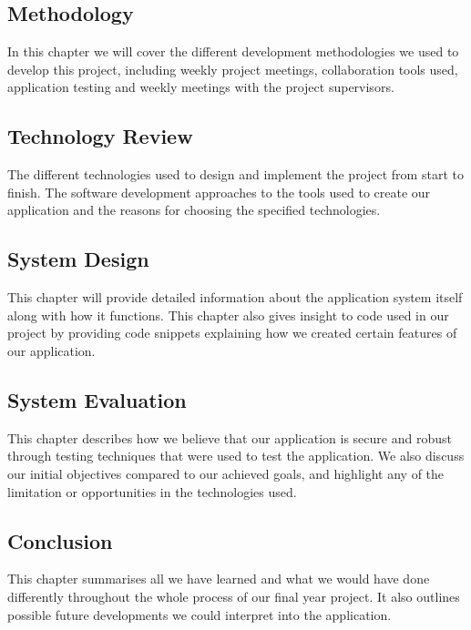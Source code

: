 \subsection{Methodology}
In this chapter we will cover the different development methodologies we used to develop this project, including weekly project meetings, collaboration tools used, application testing and weekly meetings with the project supervisors.

\subsection{Technology Review}
The different technologies used to design and implement the project from start to finish. The software development approaches to the tools used to create our application and the reasons for choosing the specified technologies.

\subsection{System Design}
This chapter will provide detailed information about the application system itself along with how it functions. This chapter also gives insight to code used in our project by providing code snippets explaining how we created certain features of our application.

\subsection{System Evaluation}
This chapter describes how we believe that our application is secure and robust through testing techniques that were used to test the application. We also discuss our initial objectives compared to our achieved goals, and highlight any of the limitation or opportunities in the technologies used.

\subsection{Conclusion}
This chapter summarises all we have learned and what we would have done differently throughout the whole process of our final year project. It also outlines possible future developments we could interpret into the application.



